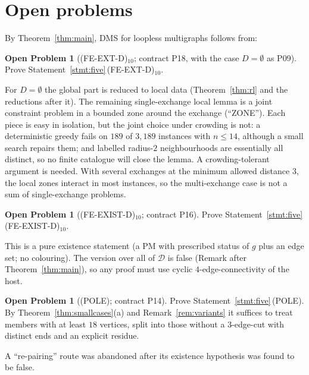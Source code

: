 \documentclass[11pt]{amsart}
\theoremstyle{definition}
\newtheorem{problem}[theorem]{Open Problem}
\theoremstyle{remark}
\newcommand{\cD}{\mathcal{D}}
\newcommand{\hyp}[1]{\textup{(#1)}}
\begin{document}
\section{Open problems}\label{sec:open}

By Theorem~\ref{thm:main}, DMS for loopless multigraphs follows from:

\begin{problem}[\hyp{FE-EXT-D}$_{10}$; contract P18, with the case $D=\emptyset$ as P09]\label{prob:p18}
Prove Statement~\ref{stmt:five}\,\hyp{FE-EXT-D}$_{10}$.
\end{problem}
For $D=\emptyset$ the global part is reduced to local data (Theorem~\ref{thm:rl} and the reductions after it). The remaining single-exchange local lemma is a joint constraint problem in a bounded zone around the exchange (``ZONE''). Each piece is easy in isolation, but the joint choice under crowding is not: a deterministic greedy fails on $189$ of $3{,}189$ instances with $n\le 14$, although a small search repairs them; and labelled radius-$2$ neighbourhoods are essentially all distinct, so no finite catalogue will close the lemma. A crowding-tolerant argument is needed. With several exchanges at the minimum allowed distance $3$, the local zones interact in most instances, so the multi-exchange case is not a sum of single-exchange problems.

\begin{problem}[\hyp{FE-EXIST-D}$_{10}$; contract P16]\label{prob:p16}
Prove Statement~\ref{stmt:five}\,\hyp{FE-EXIST-D}$_{10}$.
\end{problem}
This is a pure existence statement (a PM with prescribed status of $g$ plus an edge set; no colouring). The version over all of $\cD$ is false (Remark after Theorem~\ref{thm:main}), so any proof must use cyclic $4$-edge-connectivity of the host.

\begin{problem}[\hyp{POLE}; contract P14]\label{prob:p14}
Prove Statement~\ref{stmt:five}\,\hyp{POLE}. By Theorem~\ref{thm:smallcases}(a) and Remark~\ref{rem:variants} it suffices to treat members with at least $18$ vertices, split into those without a $3$-edge-cut with distinct ends and an explicit residue.
\end{problem}
A ``re-pairing'' route was abandoned after its existence hypothesis was found to be false.
\end{document}

